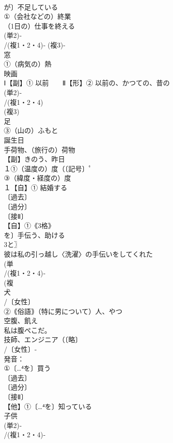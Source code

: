 \documentclass[8pt]{extreport}
\begin{document}
\begin{CJK}{UTF8}{min}
\\	が〕不足している
\\	①（会社などの）終業 
\\	（1日の）仕事を終える
\\	(単2)‐
\\	/(複1・2・4)‐ (複3)‐
\\	窓
\\	①（病気の）熱
\\	映画
\\	Ⅰ【副】① 以前　　Ⅱ【形】② 以前の、かつての、昔の 
\\	(単2)‐
\\	/(複1・2・4)
\\	(複3)
\\	足 
\\	③（山の）ふもと
\\	誕生日 
\\	手荷物、（旅行の）荷物
\\	【副】きのう、昨日
\\	１①（温度の）度（〔記号〕ﾟ 
\\	③（緯度・経度の）度
\\	１【自】① 結婚する
\\	〔過去〕
\\	〔過分〕
\\	〔接Ⅱ〕
\\	【自】①《3格》
\\	を〕手伝う、助ける
\\	3と〗
\\	彼は私の引っ越し〈洗濯〉の手伝いをしてくれた 
\\	(単
\\	/(複1・2・4)‐
\\	(複
\\	犬
\\	/〔女性〕
\\	②｟俗語｠（特に男について）人、やつ
\\	空腹、飢え
\\	私は腹ぺこだ。
\\	技師、エンジニア（〔略〕
\\	/〔女性〕‐
\\	発音：
\\	①〔…⁴を〕買う 
\\	〔過去〕
\\	〔過分〕
\\	〔接Ⅱ〕
\\	【他】①〔…⁴を〕知っている
\\	子供 
\\	(単2)‐
\\	/(複1・2・4)‐

\end{CJK}
\end{document}
